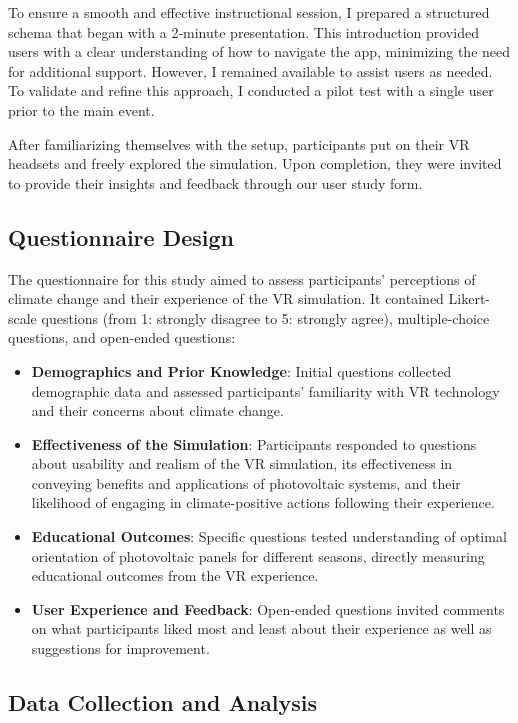 \documentclass[draft, final]{vutinfth} %
\begin{document}
To ensure a smooth and effective instructional session, I prepared a structured schema that began with a 2-minute presentation. This introduction provided users with a clear understanding of how to navigate the app, minimizing the need for additional support. However, I remained available to assist users as needed. To validate and refine this approach, I conducted a pilot test with a single user prior to the main event.

After familiarizing themselves with the setup, participants put on their VR headsets and freely explored the simulation. Upon completion, they were invited to provide their insights and feedback through our user study form.

\subsection{Questionnaire Design}

The questionnaire for this study aimed to assess participants' perceptions of climate change and their experience of the VR simulation. It contained Likert-scale questions (from 1: strongly disagree to 5: strongly agree), multiple-choice questions, and open-ended questions:

\begin{itemize}
    \item \textbf{Demographics and Prior Knowledge}: Initial questions collected demographic data and assessed participants' familiarity with VR technology and their concerns about climate change.
    \item \textbf{Effectiveness of the Simulation}: Participants responded to questions about usability and realism of the VR simulation, its effectiveness in conveying benefits and applications of photovoltaic systems, and their likelihood of engaging in climate-positive actions following their experience.
    \item \textbf{Educational Outcomes}: Specific questions tested understanding of optimal orientation of photovoltaic panels for different seasons, directly measuring educational outcomes from the VR experience.
    \item \textbf{User Experience and Feedback}: Open-ended questions invited comments on what participants liked most and least about their experience as well as suggestions for improvement.
\end{itemize}

\subsection{Data Collection and Analysis}
\end{document}
